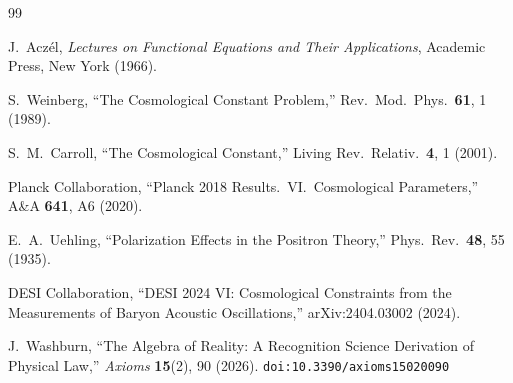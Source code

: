 \documentclass[12pt,a4paper]{article}
\theoremstyle{definition}
\theoremstyle{remark}
\begin{document}
\begin{thebibliography}{99}

J.~Acz\'el, \emph{Lectures on Functional Equations and Their Applications},
Academic Press, New York (1966).

S.~Weinberg, ``The Cosmological Constant Problem,''
Rev.\ Mod.\ Phys.\ \textbf{61}, 1 (1989).

S.~M.~Carroll, ``The Cosmological Constant,''
Living Rev.\ Relativ.\ \textbf{4}, 1 (2001).

Planck Collaboration, ``Planck 2018 Results.\ VI.\
Cosmological Parameters,'' A\&A \textbf{641}, A6 (2020).

E.~A.~Uehling, ``Polarization Effects in the Positron Theory,''
Phys.\ Rev.\ \textbf{48}, 55 (1935).

DESI Collaboration, ``DESI 2024 VI: Cosmological Constraints
from the Measurements of Baryon Acoustic Oscillations,''
arXiv:2404.03002 (2024).

J.~Washburn, ``The Algebra of Reality: A Recognition Science Derivation
of Physical Law,'' \emph{Axioms} \textbf{15}(2), 90 (2026).
\texttt{doi:10.3390/axioms15020090}

\end{thebibliography}
\end{document}
